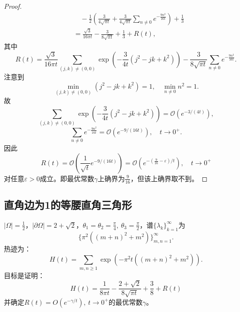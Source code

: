 \documentclass[UTF8,zihao=5,linespread=1.34]{ctexart}
\theoremstyle{cnplain}
\theoremstyle{cnremark}
\begin{document}
\begin{proof}
\begin{align*}
&\quad - \frac{1}{2}\left(\frac{3}{4\sqrt{\pi t}}
      + \frac{3}{4\sqrt{\pi t}} \sum_{n \neq 0} e^{-\frac{9n^{2}}{16t}}\right) + \frac{1}{3} \\
&= \frac{\sqrt{3}}{16\pi t} - \frac{3}{8\sqrt{\pi t}} + \frac{1}{3} + R(t),
\end{align*}
其中
\[
R(t) = \frac{\sqrt{3}}{16\pi t} \sum_{(j,k) \neq (0,0)} \exp\left(-\frac{3}{4t} (j^{2} - jk + k^{2})\right)
      - \frac{3}{8\sqrt{\pi t}} \sum_{n \neq 0} e^{-\frac{9n^{2}}{16t}}.
\]
注意到
\[
\min_{(j,k) \neq (0,0)} (j^{2} - jk + k^{2}) = 1,\quad \min_{n \neq 0} n^{2} = 1.
\]
故
\[
\sum_{(j,k) \neq (0,0)} \exp\left(-\frac{3}{4t} (j^{2} - jk + k^{2})\right)
= \mathcal{O}(e^{-3/(4t)}),
\]
\[
\sum_{n \neq 0} e^{-\frac{9n^{2}}{16t}} = \mathcal{O}(e^{-9/(16t)}),\quad t \rightarrow 0^{+}.
\]
因此
\[
R(t) = \mathcal{O}\left(\frac{1}{\sqrt{t}} e^{-9/(16t)}\right)
= \mathcal{O}\left(e^{-(\frac{9}{16} - \varepsilon)/t}\right),\quad t \rightarrow 0^{+}
\]
对任意$\varepsilon > 0$成立。即最优常数$\gamma$上确界为$\frac{9}{16}$，但该上确界取不到。
\end{proof}

\subsection{直角边为1的等腰直角三角形}

$|\Omega| = \frac{1}{2}$，$|\partial\Omega| = 2 + \sqrt{2}$，$\theta_{1} = \theta_{2} = \frac{\pi}{4},\ \theta_{3} = \frac{\pi}{2}$，谱$\{\lambda_{k}\}_{k=1}^{\infty}$为
\[
\{\pi^{2}((m+n)^{2} + m^{2})\}_{m,n=1}^{\infty}.
\]
热迹为：
\[
H(t) = \sum_{m,n \geq 1} \exp\left(-\pi^{2} t ((m+n)^{2} + m^{2})\right).
\]
目标是证明：
\[
H(t) = \frac{1}{8\pi t} - \frac{2 + \sqrt{2}}{8\sqrt{\pi t}} + \frac{3}{8} + R(t)
\]
并确定$R(t) = O(e^{-\gamma/t}),\ t \rightarrow 0^{+}$的最优常数$\gamma$。
\end{document}
